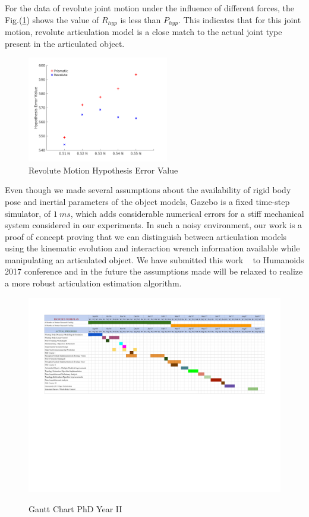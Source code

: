 \documentclass[12pt,a4paper]{report}
\begin{document}
For the data of revolute joint motion under the influence of different forces, the Fig.(\ref{rhypdiff}) shows the value of $R_{hyp}$ is less than $P_{hyp}$. This indicates that for this joint motion, revolute articulation model is a close match to the actual joint type present in the articulated object.

\begin{figure}[H]
  \centering
  \includegraphics[width=0.55\textwidth]{figures/rhypdiff.png}
  \caption{Revolute Motion Hypothesis Error Value}
  \label{rhypdiff}
\end{figure}

Even though we made several assumptions about the availability of rigid body pose and inertial parameters of the object models, Gazebo is a fixed time-step simulator, of $1~ms$, which adds considerable numerical errors for a stiff mechanical  system considered in our experiments. In such a noisy environment, our work is a proof of concept proving that we can distinguish between articulation models using the kinematic evolution and interaction wrench information available while manipulating an articulated object. We have submitted  this work ~\cite{momentumTopology2017} to Humanoids 2017 conference and in the future the assumptions made will be relaxed to realize a more robust articulation estimation algorithm.



\begin{landscape}
	\begin{figure}[!ht]
		\centering
		\caption{Gantt Chart PhD Year II}
		\includegraphics[scale=1]{PhD_year2_gantt.pdf}
		\label{gantt}
	\end{figure}
\end{landscape}
\end{document}
